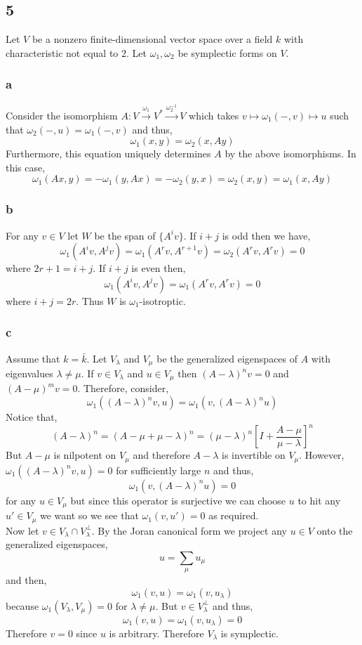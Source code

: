 \documentclass[12pt]{article}
\begin{document}
\subsection{5}

Let $V$ be a nonzero finite-dimensional vector space over a field $k$ with characteristic not equal to $2$. Let $\omega_1, \omega_2$ be symplectic forms on $V$.

\subsubsection{a}

Consider the isomorphism $A : V \xrightarrow{\omega_1} V^* \xrightarrow{\omega_2^{-1}} V$ which takes $v \mapsto \omega_1(-,v) \mapsto u$ such that $\omega_2(-,u) = \omega_1(-, v)$ and thus,
\[ \omega_1(x, y) = \omega_2(x, A y) \]
Furthermore, this equation uniquely determines $A$ by the above isomorphisms. In this case,
\[ \omega_1(A x, y) = - \omega_1(y, Ax) = - \omega_2(y, x) = \omega_2(x, y) = \omega_1(x, A y) \]

\subsubsection{b}

For any $v \in V$ let $W$ be the span of $\{ A^i v \}$. If $i + j$ is odd then we have,
\[ \omega_1(A^i v, A^j v) = \omega_1(A^{r} v, A^{r+1} v) = \omega_2(A^r v, A^r v) = 0 \]
where $2 r + 1 = i + j$. If $i + j$ is even then,
\[ \omega_1(A^i v, A^j v) = \omega_1(A^r v, A^r v)  = 0 \]
where $i + j = 2r$. Thus $W$ is $\omega_1$-isotroptic.

\subsubsection{c}

Assume that $k = \bar{k}$. Let $V_\lambda$ and $V_\mu$ be the generalized eigenspaces of $A$ with eigenvalues $\lambda \neq \mu$. If $v \in V_\lambda$ and $u \in V_\mu$ then $(A - \lambda)^n v = 0$ and $(A - \mu)^m v = 0$. Therefore, consider,
\[ \omega_1((A - \lambda)^n v, u) = \omega_1(v, (A - \lambda)^n u) \]
Notice that,
\[ (A - \lambda)^n = (A - \mu + \mu - \lambda)^n = (\mu - \lambda)^n \left[ I + \frac{A - \mu}{\mu - \lambda} \right]^n \]
But $A - \mu$ is nilpotent on $V_\mu$ and therefore $A - \lambda$ is invertible on $V_\mu$.
However, $ \omega_1((A - \lambda)^n v, u) = 0$ for sufficiently large $n$ and thus,
\[  \omega_1(v, (A - \lambda)^n u) = 0 \]
for any $u \in V_\mu$ but since this operator is surjective we can choose $u$ to hit any $u' \in V_\mu$ we want so we see that $\omega_1(v, u') = 0$ as required. 
\bigskip\\
Now let $v \in V_\lambda \cap V_\lambda^\perp$. By the Joran canonical form we project any $u \in V$ onto the generalized eigenspaces,
\[ u = \sum_\mu u_\mu \]
and then,
\[ \omega_1(v, u) = \omega_1(v, u_\lambda) \]
because $\omega_1(V_\lambda, V_\mu) = 0$ for $\lambda \neq \mu$. But $v \in V_\lambda^\perp$ and thus,
\[ \omega_1(v,u) = \omega_1(v, u_\lambda) = 0 \]
Therefore $v = 0$ since $u$ is arbitrary. 
Therefore $V_\lambda$ is symplectic.
\end{document}
